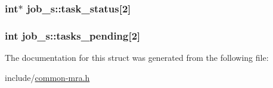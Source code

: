 \hypertarget{structjob__s_a25c05f7bc2c55b8626a947c42fbea207}{
\subsubsection[{task\-\_\-status}]{\setlength{\rightskip}{0pt plus 5cm}int$\ast$ {\bf job\-\_\-s\-::task\-\_\-status}\mbox{[}2\mbox{]}}}\label{structjob__s_a25c05f7bc2c55b8626a947c42fbea207}
\hypertarget{structjob__s_a2121f93a58679fe228efdefe7bdcd1ba}{
\subsubsection[{tasks\-\_\-pending}]{\setlength{\rightskip}{0pt plus 5cm}int {\bf job\-\_\-s\-::tasks\-\_\-pending}\mbox{[}2\mbox{]}}}\label{structjob__s_a2121f93a58679fe228efdefe7bdcd1ba}


\-The documentation for this struct was generated from the following file\-:\begin{DoxyCompactItemize}
\item 
include/\hyperlink{common-mra_8h}{common-\/mra.\-h}\end{DoxyCompactItemize}
